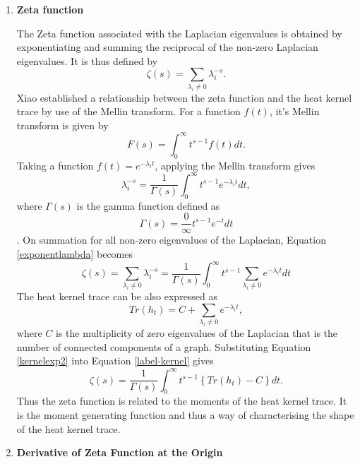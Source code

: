\documentclass[10pt,a4paper]{article}
\begin{document}
\begin{enumerate}[1]
            \item \textbf{Zeta function}
            
            The Zeta function associated with the Laplacian eigenvalues is obtained by exponentiating and summing the reciprocal of the non-zero Laplacian eigenvalues. It is thus defined by
            \begin{equation}
            \zeta(s) = \sum_{\lambda_i \neq 0} \lambda_i ^{-s}.
            \end{equation} 
            Xiao \cite{xiao2009graph} established a relationship between the zeta function and the heat kernel trace by use of the Mellin transform. For a function $f(t)$, it's Mellin transform is given by
            \begin{equation}
            F(s) = \int_{0}^{\infty} t^{s-1} f(t) dt.
            \end{equation}
            Taking a function $f(t)=e^{-\lambda_i t}$, applying the Mellin transform gives 
            \begin{equation}
            \lambda_i ^{-s} = \frac{1}{\Gamma(s)} \int_{0}^{\infty} t^{s-1} e^{-\lambda_i t} dt,
            \label{exponentlambda}
            \end{equation}
            where $\Gamma(s)$ is the gamma function defined as 
            \begin{equation}
            \Gamma(s) = \frac{0}{\infty} t^{s-1} e^{-t} dt
            \end{equation}.
            On summation for all non-zero eigenvalues of the Laplacian, Equation \ref{exponentlambda} becomes
            \begin{equation}
            \zeta(s) = \sum_{\lambda_i \neq 0} \lambda_i ^{-s} = \frac{1}{\Gamma(s)} \int_{0}^{\infty} t^{s-1} \sum_{\lambda_i \neq 0} e^{-\lambda_i t} dt
            \label{label-kernel}
            \end{equation}
            The heat kernel trace can be also expressed as 
            \begin{equation}
            Tr(h_t) = C + \sum_{\lambda_i \neq 0} e^{-\lambda_i t}
            \label{kernelexp2},
            \end{equation}
            where $C$ is the multiplicity of zero eigenvalues of the Laplacian that is the number of connected components of a graph.
            Substituting Equation \ref{kernelexp2} into Equation 
            \ref{label-kernel} gives
            \begin{equation}
            \zeta(s) = \frac{1}{\Gamma(s)} \int_{0}^{\infty} t^{s-1} \left \{ Tr(h_t)-C \right \} dt.
            \end{equation}
            Thus the zeta function is related to the moments of the heat kernel trace. It is the moment generating function and thus a way of characterising the shape of the heat kernel trace.
          \item \textbf{Derivative of Zeta Function at the Origin}
          

\end{enumerate}
\end{document}
